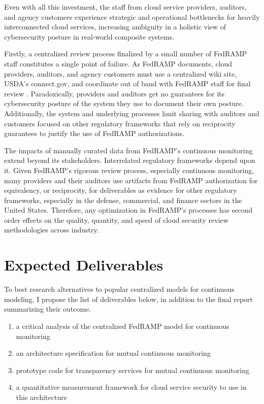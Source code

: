 \documentclass{jdf}
\begin{document}
Even with all this investment, the staff from cloud service providers, auditors, and agency customers experience strategic and operational bottlenecks for heavily interconnected cloud services, increasing ambiguity in a holistic view of cybersecurity posture in real-world composite systems. 

Firstly, a centralized review process finalized by a small number of FedRAMP staff constitutes a single point of failure. As FedRAMP documents, cloud providers, auditors, and agency customers must use a centralized wiki site, USDA's connect.gov, and coordinate out of band with FedRAMP staff for final review \citeyear[pp.~3,14]{fedramp_auth_playbook25}. Paradoxically, providers and auditors get no guarantees for its cybersecurity posture of the system they use to document their own posture. Additionally, the system and underlying processes limit sharing with auditors and customers focused on other regulatory frameworks that rely on reciprocity guarantees to justify the use of FedRAMP authorizations.

The impacts of manually curated data from FedRAMP's continuous monitoring extend beyond its stakeholders. Interrelated regulatory frameworks depend upon it. Given FedRAMP's rigorous review process, especially continuous monitoring, many providers and their auditors use artifacts from FedRAMP authorization for equivalency, or reciprocity, for deliverables as evidence for other regulatory frameworks, especially in the defense, commercial, and finance sectors in the United States. Therefore, any optimization in FedRAMP's processes has second order effects on the quality, quantity, and speed of cloud security review methodologies across industry.

\section{Expected Deliverables}

To best research alternatives to popular centralized models for continuous modeling, I propose the list of deliverables below, in addition to the final report summarizing their outcome. 

\begin{enumerate}
    \item a critical analysis of the centralized FedRAMP model for continuous monitoring
    \item an architecture specification for mutual continuous monitoring
    \item prototype code for transparency services for mutual continuous monitoring
    \item a quantitative measurement framework for cloud service security to use in this architecture
\end{enumerate}



\end{document}
